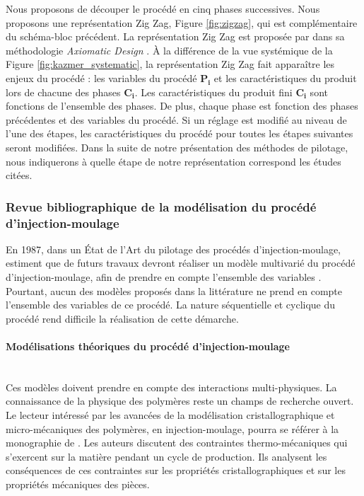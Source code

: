 Nous proposons de découper le procédé en cinq phases successives.
Nous proposons une représentation Zig Zag, Figure \ref{fig:zigzag}, qui est complémentaire du schéma-bloc précédent.
La représentation Zig Zag est proposée par \citeauthor{suh_principles_1990} dans sa méthodologie \textit{Axiomatic Design} \cite{suh_principles_1990}.
À la différence de la vue systémique de la Figure \ref{fig:kazmer_systematic}, la représentation Zig Zag fait apparaître les enjeux du procédé : les variables du procédé $\boldsymbol{P_i}$ et les caractéristiques du produit lors de chacune des phases $\boldsymbol{C_i}$.
Les caractéristiques du produit fini $\boldsymbol{C_i}$ sont fonctions de l’ensemble des phases.
De plus, chaque phase est fonction des phases précédentes et des variables du procédé.
Si un réglage est modifié au niveau de l’une des étapes, les caractéristiques du procédé pour toutes les étapes suivantes seront modifiées.
Dans la suite de notre présentation des méthodes de pilotage, nous indiquerons à quelle étape de notre représentation correspond les études citées.

\subsubsection{Revue bibliographique de la modélisation du procédé d'injection-moulage}
En 1987, dans un État de l’Art du pilotage des procédés d’injection-moulage, \citeauthor{agrawal_injection-molding_1987} estiment que de futurs travaux devront réaliser un modèle multivarié du procédé d'injection-moulage, afin de prendre en compte l’ensemble des variables \cite{agrawal_injection-molding_1987}.
Pourtant, aucun des modèles proposés dans la littérature ne prend en compte l'ensemble des variables de ce procédé.
La nature séquentielle et cyclique du procédé rend difficile la réalisation de cette démarche.

\paragraph{Modélisations théoriques du procédé d'injection-moulage}\mbox{} \\
Ces modèles doivent prendre en compte des interactions multi-physiques.
La connaissance de la physique des polymères reste un champs de recherche ouvert.
Le lecteur intéressé par les avancées de la modélisation cristallographique et micro-mécaniques des polymères, en injection-moulage, pourra se référer à la monographie de \citeauthor{galeski_nano_2009} \cite{galeski_nano_2009}.
Les auteurs discutent des contraintes thermo-mécaniques qui s'exercent sur la matière pendant un cycle de production.
Ils analysent les conséquences de ces contraintes sur les propriétés cristallographiques et sur les propriétés mécaniques des pièces.

